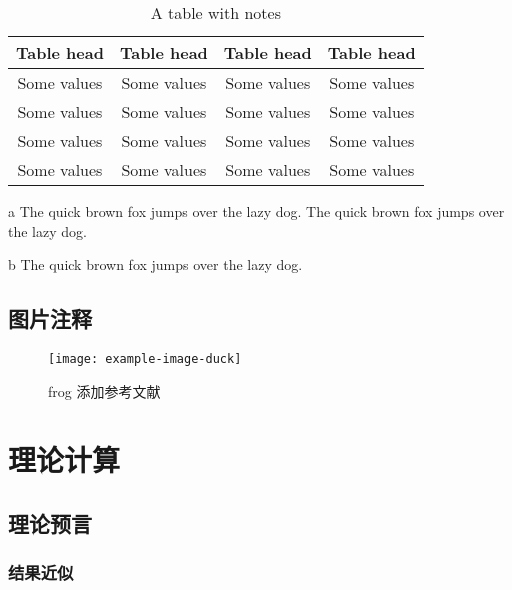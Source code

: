 \zhlipsum[2]


\begin{table}[h!]
	\caption{A table with notes}\label{tab:tablenotes}
	\centering
	\begin{threeparttable}
		\begin{tabular}{*4{c}}\toprule
			Table head\tnote{a} & Table head & Table head & Table head\tnote{b} \\ \midrule
			Some values & Some values & Some values & Some values \\
			Some values & Some values & Some values & Some values \\
			Some values & Some values & Some values & Some values \\
			Some values & Some values & Some values & Some values \\ \bottomrule
		\end{tabular}
		\begin{tablenotes}
			\footnotesize
			\item[a] The quick brown fox jumps over the lazy dog. The quick brown fox jumps over the lazy dog.
			\item[b] The quick brown fox jumps over the lazy dog.
		\end{tablenotes}
	\end{threeparttable}
\end{table}


\subsection{图片注释}

\begin{figure}[h!]
	\centering                        
	\texttt{[image: example-image-duck]}
	\caption[frog]{frog \footnotemark 添加参考文献\cite{2003张量分析} }
	\label{fig:pic1}
\end{figure}


\section{理论计算}%

\zhlipsum[2]

\subsection{理论预言}%

\zhlipsum[3]

\subsubsection{结果近似}%

\zhlipsum[4]